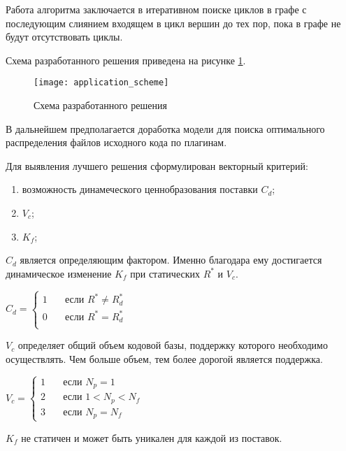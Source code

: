 Работа алгоритма заключается в итеративном поиске циклов в графе с последующим слиянием входящем в цикл вершин до тех пор, пока в графе не будут отсутствовать циклы.

Схема разработанного решения приведена на рисунке \ref{fig:application_scheme}.

\begin{figure}[H]
    \centering
    \texttt{[image: application\_scheme]}
    \caption{Схема разработанного решения}
    \label{fig:application_scheme}
\end{figure}

В дальнейшем предполагается доработка модели для поиска оптимального распределения файлов исходного кода по плагинам.

Для выявления лучшего решения сформулирован векторный критерий:
\begin{enumerate}
    \item возможность динамеческого ценнобразования поставки $C_{d}$;
    \item $V_{c}$;
    \item $K_{f}$;
\end{enumerate}

$C_{d}$ является определяющим фактором. Именно благодара ему достигается динамическое изменение $K_{f}$ при статических $R^{*}$ и $V_{c}$.

$ C_{d} =
  \begin{cases}
    1 & \quad \text{если } R^{*} \not = R^{*}_{d}\\
    0 & \quad \text{если } R^{*} = R^{*}_{d}\\
  \end{cases}
$

$V_{c}$ определяет общий объем кодовой базы, поддержку которого необходимо осуществлять. Чем больше объем, тем более дорогой является поддержка.

$ V_{c} =
  \begin{cases}
    1 & \quad \text{если } N_{p} = 1 \\
    2 & \quad \text{если } 1 < N_{p} < N_{f} \\
    3 & \quad \text{если } N_{p} = N_{f}
  \end{cases}
$

$K_{f}$ не статичен и может быть уникален для каждой из поставок.

